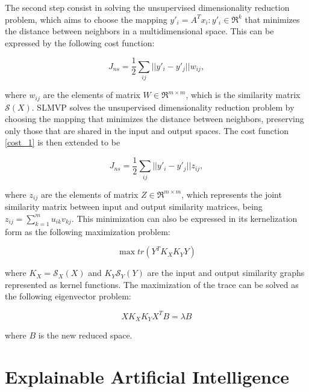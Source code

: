 The second step consist in solving the unsupervised dimensionality reduction problem, which aims to choose the mapping $y'_i = A^T x_i : y'_i \in \mathfrak{R}^k$ that minimizes the distance between neighbors in a multidimensional space. This can be expressed by the following cost function:

\begin{equation}\label{cost_1}
    J_{ns} = \frac{1}{2} \sum_{ij} || y'_i - y'_j || w_{ij},
\end{equation}

where $w_{ij}$ are the elements of matrix $W \in \mathfrak{R}^{m \times m}$, which is the similarity matrix $\mathscr{S}(X)$.
SLMVP solves the unsupervised dimensionality reduction problem  by choosing the mapping that  minimizes the distance between neighbors, preserving only those that are shared in the input and output spaces. The cost function \ref{cost_1} is then extended to be

\begin{equation}
    J_{ns} = \frac{1}{2} \sum_{ij} || y'_i - y'_j || z_{ij},
\end{equation}

where $z_{ij}$ are the elements of matrix $Z \in \mathfrak{R}^{m \times m}$, which represents the joint similarity matrix between input and output similarity matrices, being $z_{ij} = \sum^m_{k=1} u_{ik}v_{kj}$. This minimization can also be expressed in its kernelization form as the following maximization problem:

\begin{equation}
    \max tr(Y^T K_X K_Y Y)
\end{equation}

where $K_X = \mathscr{S}_X(X)$ and $K_Y \mathscr{S}_Y(Y)$ are the input and output similarity graphs represented as kernel functions. The maximization of the trace can be solved as the following eigenvector problem:

\begin{equation}
    X K_X K_Y X^T B = \lambda B
\end{equation}

where $B$ is the new reduced space.

\section{Explainable Artificial Intelligence}